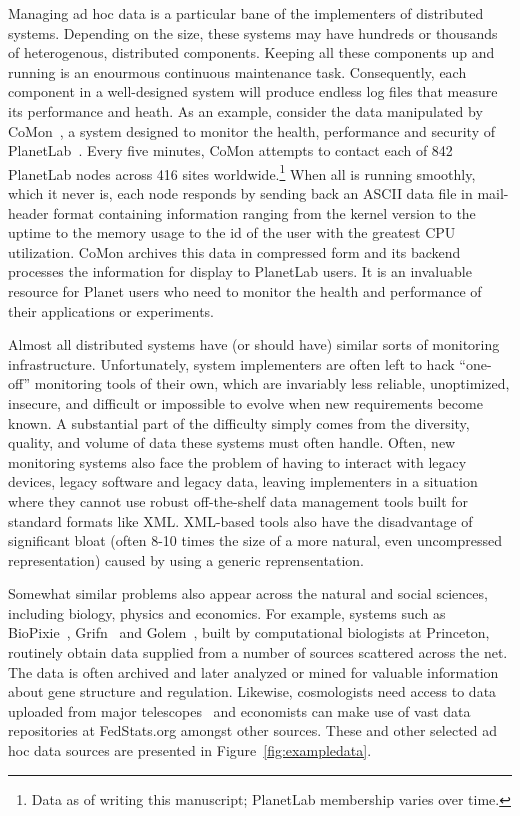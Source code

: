 \documentclass[nocopyrightspace]{sigplanconf}
\begin{document}
Managing ad hoc data 
is a particular bane of the implementers of distributed systems.
Depending on the size, these systems may have hundreds or thousands
of heterogenous, distributed components.  Keeping all these components
up and running is an enourmous continuous maintenance task.  Consequently,
each component in a well-designed system will produce endless log files
that measure its performance and heath.  As an example, consider the data
manipulated by CoMon~\cite{comon}, a system designed to monitor the
health, performance and security of PlanetLab~\cite{planetlab}.  Every
five minutes, CoMon attempts to contact each of 842 PlanetLab nodes
across 416 sites worldwide.\footnote{Data as of writing this manuscript;
PlanetLab membership varies over time.}  
When all is running smoothly, which it
never is, each node responds by sending back an ASCII data file
in mail-header format containing information ranging from
the kernel version to the uptime to the memory usage to the id of the
user with the greatest CPU utilization.  CoMon archives this data in
compressed form and its backend processes the information for display
to PlanetLab users.  It is an invaluable resource for Planet users
who need to monitor the health and performance of their applications
or experiments.  

Almost all distributed systems have (or should have) similar sorts of
monitoring infrastructure.  Unfortunately, system implementers are
often left to hack ``one-off'' monitoring tools of their own, which
are invariably less reliable, unoptimized, insecure, and difficult or
impossible to evolve when new requirements become known.  A
substantial part of the difficulty simply comes from the diversity,
quality, and volume of data these systems must often handle. Often,
new monitoring systems also face the problem of having to interact
with legacy devices, legacy software and legacy data, leaving
implementers in a situation where they cannot use robust off-the-shelf
data management tools built for standard formats like XML.  XML-based
tools also have the disadvantage of significant bloat (often 8-10 times
the size of a more natural, even uncompressed representation) caused by
using a generic reprensentation.

Somewhat similar problems also appear
across the natural and social sciences, including biology,
physics and economics.  For example, systems such as BioPixie~\cite{biopixie}, Grifn~\cite{grifn} and Golem~\cite{golem}, built by
computational biologists at Princeton,
routinely obtain data supplied from a number of sources scattered 
across the net.  The data is often archived and later analyzed or mined 
for valuable information about gene structure and regulation.  Likewise, 
cosmologists need access to data uploaded from major telescopes~\cite{sdss}
and economists can make use of vast data repositories at FedStats.org
amongst other sources.  These and other selected ad hoc data sources 
are presented in Figure~\ref{fig:exampledata}.
\end{document}
